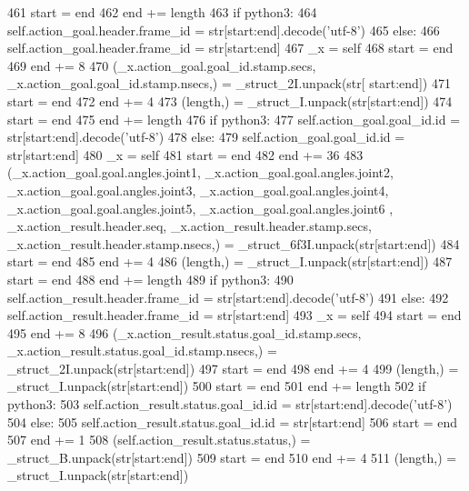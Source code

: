 \begin{DoxyCode}
461       start = end
462       end += length
463       \textcolor{keywordflow}{if} python3:
464         self.action\_goal.header.frame\_id = str[start:end].decode(\textcolor{stringliteral}{'utf-8'})
465       \textcolor{keywordflow}{else}:
466         self.action\_goal.header.frame\_id = str[start:end]
467       \_x = self
468       start = end
469       end += 8
470       (\_x.action\_goal.goal\_id.stamp.secs, \_x.action\_goal.goal\_id.stamp.nsecs,) = \_struct\_2I.unpack(str[
      start:end])
471       start = end
472       end += 4
473       (length,) = \_struct\_I.unpack(str[start:end])
474       start = end
475       end += length
476       \textcolor{keywordflow}{if} python3:
477         self.action\_goal.goal\_id.id = str[start:end].decode(\textcolor{stringliteral}{'utf-8'})
478       \textcolor{keywordflow}{else}:
479         self.action\_goal.goal\_id.id = str[start:end]
480       \_x = self
481       start = end
482       end += 36
483       (\_x.action\_goal.goal.angles.joint1, \_x.action\_goal.goal.angles.joint2, 
      \_x.action\_goal.goal.angles.joint3, \_x.action\_goal.goal.angles.joint4, \_x.action\_goal.goal.angles.joint5, \_x.action\_goal.goal.angles.joint6
      , \_x.action\_result.header.seq, \_x.action\_result.header.stamp.secs, \_x.action\_result.header.stamp.nsecs,) = 
      \_struct\_6f3I.unpack(str[start:end])
484       start = end
485       end += 4
486       (length,) = \_struct\_I.unpack(str[start:end])
487       start = end
488       end += length
489       \textcolor{keywordflow}{if} python3:
490         self.action\_result.header.frame\_id = str[start:end].decode(\textcolor{stringliteral}{'utf-8'})
491       \textcolor{keywordflow}{else}:
492         self.action\_result.header.frame\_id = str[start:end]
493       \_x = self
494       start = end
495       end += 8
496       (\_x.action\_result.status.goal\_id.stamp.secs, \_x.action\_result.status.goal\_id.stamp.nsecs,) = 
      \_struct\_2I.unpack(str[start:end])
497       start = end
498       end += 4
499       (length,) = \_struct\_I.unpack(str[start:end])
500       start = end
501       end += length
502       \textcolor{keywordflow}{if} python3:
503         self.action\_result.status.goal\_id.id = str[start:end].decode(\textcolor{stringliteral}{'utf-8'})
504       \textcolor{keywordflow}{else}:
505         self.action\_result.status.goal\_id.id = str[start:end]
506       start = end
507       end += 1
508       (self.action\_result.status.status,) = \_struct\_B.unpack(str[start:end])
509       start = end
510       end += 4
511       (length,) = \_struct\_I.unpack(str[start:end])

\end{DoxyCode}
